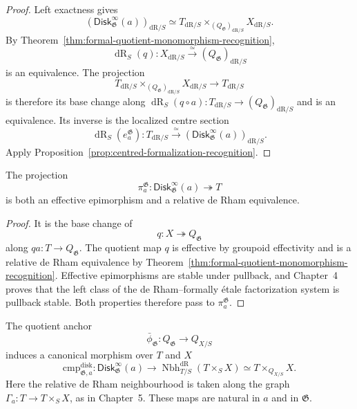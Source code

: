 \begin{proof}
Left exactness gives
\[
    (\mathsf{Disk}^{\infty}_{\mathfrak G}(a))_{\mathrm{dR}/S}
    \simeq
    T_{\mathrm{dR}/S}
    \times_{(Q_{\mathfrak G})_{\mathrm{dR}/S}}
    X_{\mathrm{dR}/S}.
\]
By Theorem~\ref{thm:formal-quotient-monomorphism-recognition},
\[
    \operatorname{dR}_S(q):
    X_{\mathrm{dR}/S}
    \xrightarrow{\simeq}
    (Q_{\mathfrak G})_{\mathrm{dR}/S}
\]
is an equivalence.  The projection
\[
    T_{\mathrm{dR}/S}
    \times_{(Q_{\mathfrak G})_{\mathrm{dR}/S}}
    X_{\mathrm{dR}/S}
    \longrightarrow
    T_{\mathrm{dR}/S}
\]
is therefore its base change along
$\operatorname{dR}_S(q\circ a):T_{\mathrm{dR}/S}\to
(Q_{\mathfrak G})_{\mathrm{dR}/S}$ and is an equivalence.  Its inverse is the
localized centre section
\[
    \operatorname{dR}_S(e^{\mathfrak G}_a):
    T_{\mathrm{dR}/S}
    \xrightarrow{\simeq}
    (\mathsf{Disk}^{\infty}_{\mathfrak G}(a))_{\mathrm{dR}/S}.
\]
Apply Proposition~\ref{prop:centred-formalization-recognition}.
\end{proof}

\begin{proposition}
\label{prop:formal-disk-effective}
The projection
\[
    \pi^{\mathfrak G}_a:
    \mathsf{Disk}^{\infty}_{\mathfrak G}(a)\twoheadrightarrow T
\]
is both an effective epimorphism and a relative de Rham equivalence.
\end{proposition}

\begin{proof}
It is the base change of
\[
    q:X\twoheadrightarrow Q_{\mathfrak G}
\]
along $qa:T\to Q_{\mathfrak G}$.  The quotient map $q$ is effective by
groupoid effectivity and is a relative de Rham equivalence by
Theorem~\ref{thm:formal-quotient-monomorphism-recognition}.  Effective
epimorphisms are stable under pullback, and Chapter~4 proves that the left
class of the de Rham--formally \'etale factorization system is pullback
stable.  Both properties therefore pass to $\pi^{\mathfrak G}_a$.
\end{proof}

\begin{proposition}
\label{prop:formal-disk-ambient-comparison}
The quotient anchor
\[
    \bar\phi_{\mathfrak G}:Q_{\mathfrak G}\to Q_{X/S}
\]
induces a canonical morphism over $T$ and $X$
\[
    \mathrm{cmp}^{\mathrm{disk}}_{\mathfrak G,a}:
    \mathsf{Disk}^{\infty}_{\mathfrak G}(a)
    \longrightarrow
    \operatorname{Nbh}^{\mathrm{dR}}_{T/S}(T\times_SX)
    \simeq
    T\times_{Q_{X/S}}X.
\]
Here the relative de Rham neighbourhood is taken along the graph
$\Gamma_a:T\to T\times_SX$, as in Chapter~5.  These maps are natural in $a$
and in $\mathfrak G$.
\end{proposition}

